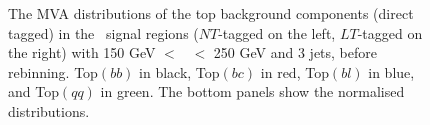 \begin{figure}[!htbp]
    \centering
      \caption{The MVA distributions of the top background components (direct tagged) in the \vhc\ signal regions ($NT$-tagged on the left, $LT$-tagged on the right) with 150 GeV $<$ \ptv\ $<$ 250 GeV and 3 jets, before rebinning. Top$(bb)$ in black, Top$(bc)$ in red, Top$(bl)$ in blue, and Top$(qq)$ in green. The bottom panels show the normalised distributions.} 
      \label{fig:topflavdistr_VHcc}
\end{figure}

